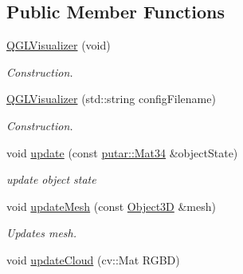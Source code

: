\subsection*{Public Member Functions}
\begin{DoxyCompactItemize}
\item 
\hyperlink{classQGLVisualizer_a7b1f8b4c0be357f9636d36ed47b09c0c}{Q\+G\+L\+Visualizer} (void)\hypertarget{classQGLVisualizer_a7b1f8b4c0be357f9636d36ed47b09c0c}{}\label{classQGLVisualizer_a7b1f8b4c0be357f9636d36ed47b09c0c}

\begin{DoxyCompactList}\small\item\em Construction. \end{DoxyCompactList}\item 
\hyperlink{classQGLVisualizer_adc2545fe51b3bfe3553b0031c8c66a31}{Q\+G\+L\+Visualizer} (std\+::string config\+Filename)\hypertarget{classQGLVisualizer_adc2545fe51b3bfe3553b0031c8c66a31}{}\label{classQGLVisualizer_adc2545fe51b3bfe3553b0031c8c66a31}

\begin{DoxyCompactList}\small\item\em Construction. \end{DoxyCompactList}\item 
void \hyperlink{classQGLVisualizer_a48d1c8965658c4e4bb1f5ead1b13adf7}{update} (const \hyperlink{namespaceputar_a8bf3c8025ae8f60f553a752014c9849a}{putar\+::\+Mat34} \&object\+State)\hypertarget{classQGLVisualizer_a48d1c8965658c4e4bb1f5ead1b13adf7}{}\label{classQGLVisualizer_a48d1c8965658c4e4bb1f5ead1b13adf7}

\begin{DoxyCompactList}\small\item\em update object state \end{DoxyCompactList}\item 
void \hyperlink{classQGLVisualizer_af264cd0d6ef16f7e1b45d9c7bd80196b}{update\+Mesh} (const \hyperlink{classputar_1_1Object3D}{Object3D} \&mesh)\hypertarget{classQGLVisualizer_af264cd0d6ef16f7e1b45d9c7bd80196b}{}\label{classQGLVisualizer_af264cd0d6ef16f7e1b45d9c7bd80196b}

\begin{DoxyCompactList}\small\item\em Updates mesh. \end{DoxyCompactList}\item 
void \hyperlink{classQGLVisualizer_ad88961c83066cb4b3874b7d4bb8419e0}{update\+Cloud} (cv\+::\+Mat R\+G\+BD)\hypertarget{classQGLVisualizer_ad88961c83066cb4b3874b7d4bb8419e0}{}\label{classQGLVisualizer_ad88961c83066cb4b3874b7d4bb8419e0}


\end{DoxyCompactItemize}
